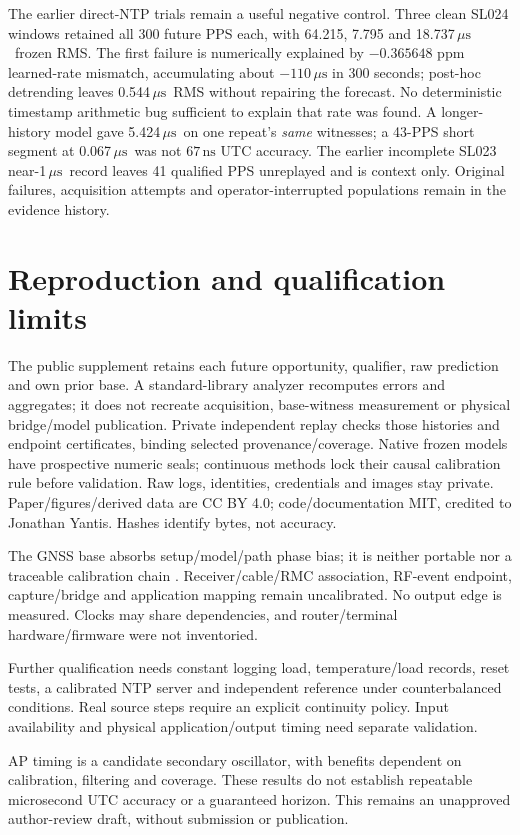 \documentclass[10pt,letterpaper]{article}
\newcommand{\us}{\ensuremath{\,\mu\mathrm{s}}}
\begin{document}
The earlier direct-NTP trials remain a useful negative control. Three clean
SL024 windows retained all 300 future PPS each, with 64.215, 7.795 and
18.737\us\ frozen RMS. The first failure is numerically explained by
$-0.365648$ ppm learned-rate mismatch, accumulating about $-110\us$ in
300 seconds; post-hoc detrending leaves 0.544\us\ RMS without repairing the
forecast. No deterministic timestamp arithmetic bug sufficient to explain that
rate was found. A longer-history model gave 5.424\us\ on one repeat's
\emph{same} witnesses; a 43-PPS short segment at 0.067\us\ was not $67\,\mathrm{ns}$ UTC
accuracy. The earlier incomplete SL023 near-1\us\ record leaves 41 qualified
PPS unreplayed and is context only. Original failures, acquisition attempts and
operator-interrupted populations remain in the evidence history.

\section{Reproduction and qualification limits}
The public supplement retains each future opportunity, qualifier, raw
prediction and own prior base. A standard-library analyzer recomputes errors
and aggregates; it does not recreate acquisition, base-witness measurement or
physical bridge/model publication. Private independent replay checks those
histories and endpoint certificates, binding selected provenance/coverage.
Native frozen models have prospective numeric seals; continuous methods lock
their causal calibration rule before validation. Raw logs, identities,
credentials and images stay private. Paper/figures/derived data are CC BY 4.0;
code/documentation MIT, credited to Jonathan Yantis. Hashes identify bytes,
not accuracy.

The GNSS base absorbs setup/model/path phase bias; it is neither portable nor
a traceable calibration chain \citep{traceability2019}. Receiver/cable/RMC
association, RF-event endpoint, capture/bridge and application mapping remain
uncalibrated. No output edge is measured. Clocks may share dependencies, and
router/terminal hardware/firmware were not inventoried.

Further qualification needs constant logging load, temperature/load records,
reset tests, a calibrated NTP server and independent reference under
counterbalanced conditions. Real source steps require an explicit continuity
policy. Input availability and physical application/output timing need separate
validation.

AP timing is a candidate secondary oscillator, with benefits dependent on
calibration, filtering and coverage. These results do not establish repeatable
microsecond UTC accuracy or a guaranteed horizon. This remains an unapproved
author-review draft, without submission or publication.

\begingroup\small\setlength{\bibsep}{2pt}
\endgroup
\end{document}
